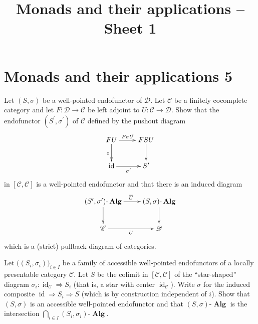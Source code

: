 \documentclass[12pt, a4paper]{article}
\date{}
\title{Monads and their applications -- Sheet 1}
\DeclareMathOperator{\id}{id}
\DeclareMathOperator{\Alg}{\mathbf{Alg}}
\newcommand{\ca}[1]{\mathscr{#1}}
\theoremstyle{plain}
\theoremstyle{definition}
\theoremstyle{citing}
\theoremstyle{citingdfn}
\numberwithin{equation}{section}
\begin{document}

\pagestyle{empty}
\section*{Monads and their applications 5}

\begin{question} 
 Let $(S, \sigma)$ be a well-pointed endofunctor of $\ca{D}$. Let $\ca{C}$ be a finitely cocomplete category and let $F \colon \ca{D} \rightarrow \ca{C}$ be left adjoint to $U \colon \ca{C} \rightarrow \ca{D}$. Show that the endofunctor $(S^{\prime},\sigma^{\prime})$ of $\ca{C}$ defined by the pushout diagram
 \[
 \xymatrix{FU \ar[d]_{\varepsilon} \ar[r]^-{F\sigma U} & FSU \ar[d] \\ \id \ar[r]_-{\sigma^{\prime}} & S^{\prime} }
 \]
 in $[\ca{C},\ca{C}]$ is a well-pointed endofunctor and that there is an induced diagram
 \[
\xymatrix{ (S^{\prime},\sigma^{\prime})\mbox{-}\Alg \ar[r]^{\overline{U}} \ar[d] & (S,\sigma)\mbox{-}\Alg \ar[d] \\
\ca{C} \ar[r]_-{U} & \ca{D} }
 \]
 which is a (strict) pullback diagram of categories.
\end{question}

\begin{question}
 Let $\bigl((S_i,\sigma_i)\bigr)_{i \in I}$ be a family of accessible well-pointed  endofunctors of a locally presentable category $\ca{C}$. Let $S$ be the colimit in $[\ca{C},\ca{C}]$ of the ``star-shaped'' diagram $\sigma_i \colon \id_{\ca{C}} \Rightarrow S_i$ (that is, a star with center $\id_{\ca{C}}$). Write $\sigma$ for the induced composite $\id \Rightarrow S_i \Rightarrow S$ (which is by construction independent of $i$). Show that $(S,\sigma)$ is an accessible well-pointed endofunctor and that $(S,\sigma)\mbox{-}\Alg$ is the intersection $\bigcap_{i \in I} (S_i,\sigma_i)\mbox{-} \Alg$.
\end{question}
\end{document}
